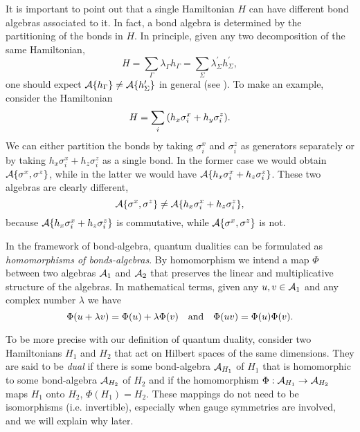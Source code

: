 It is important to point out that a single Hamiltonian $H$ can have different bond algebras associated to it.
In fact, a bond algebra is determined by the partitioning of the bonds in $H$.
In principle, given any two decomposition of the same Hamiltonian,
\begin{equation*}
    H
    = \sum_{\Gamma} \lambda_{\Gamma} h_{\Gamma}
    = \sum_{\Sigma} \lambda^\prime_{\Sigma} h^\prime_{\Sigma},
\end{equation*}
one should expect $\mathcal{A}\{h_{\Gamma}\} \neq \mathcal{A}\{ h^{\prime}_{\Sigma} \}$ in general (see \cite{cobanera2011bond}).
To make an example, consider the Hamiltonian
\begin{equation*}
    H = \sum_{i} \qty( h_x \sigma^x_i + h_y \sigma^z_i ).
\end{equation*}
We can either partition the bonds by taking $\sigma^x_i$ and $\sigma^z_i$ as generators separately or by taking $h_x \sigma^x_i + h_z \sigma^z_i$ as a single bond.
In the former case we would obtain $\mathcal{A}\{\sigma^x, \sigma^z\} $, while in the latter we would have $\mathcal{A}\{h_x \sigma^x_i + h_z \sigma^z_i\}$.
These two algebras are clearly different,
\begin{equation*}
    \mathcal{A}\{\sigma^x, \sigma^z\}
    \neq
    \mathcal{A}\{h_x \sigma^x_i + h_z \sigma^z_i\},
\end{equation*}
because $\mathcal{A}\{h_x \sigma^x_i + h_z \sigma^z_i\}$ is commutative, while $\mathcal{A}\{\sigma^x, \sigma^z\} $ is not.

In the framework of bond-algebra, quantum dualities can be formulated as \emph{homomorphisms of bonds-algebras}.
By homomorphism we intend a map $\Phi$ between two algebras $\mathcal{A}_1$ and $\mathcal{A}_2$ that preserves the linear and multiplicative structure of the algebras.
In mathematical terms, given any $u,v \in \mathcal{A}_1$ and any complex number $\lambda$ we have
\begin{equation*}
    \Phi(u + \lambda v) = \Phi(u) + \lambda \Phi(v)
    \qand
    \Phi(u v) = \Phi(u) \Phi(v).
\end{equation*}

To be more precise with our definition of quantum duality,
consider two Hamiltonians $H_1$ and $H_2$ that act on Hilbert spaces of the same dimensions.
They are said to be \emph{dual} if there is some bond-algebra $\mathcal{A}_{H_1}$ of $H_1$ that is homomorphic to some bond-algebra $\mathcal{A}_{H_2}$ of $H_2$ and if the homomorphism $\Phi : \mathcal{A}_{H_1} \to \mathcal{A}_{H_2}$ maps $H_1$ onto $H_2$, $\Phi(H_1) = H_2$.
These mappings do not need to be isomorphisms (i.e. invertible), especially when gauge symmetries are involved, and we will explain why later.

